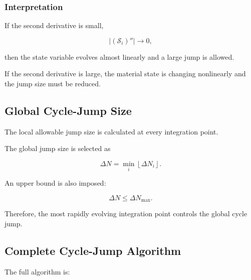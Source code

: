 ﻿\documentclass[11pt,a4paper]{article}
\begin{document}
\subsubsection*{Interpretation}

If the second derivative is small,

\[
\left|
\left(
\bm{\mathcal{S}}_i
\right)''
\right|
\rightarrow 0,
\]

then the state variable evolves almost linearly and a large jump is allowed.

If the second derivative is large, the material state is changing nonlinearly and the jump size must be reduced.

\subsection{Global Cycle-Jump Size}

The local allowable jump size is calculated at every integration point.

The global jump size is selected as

\[
\Delta N
=
\min_i
\left\lfloor
\Delta N_i
\right\rfloor.
\]

An upper bound is also imposed:

\[
\Delta N
\leq
\Delta N_{\max}.
\]

Therefore, the most rapidly evolving integration point controls the global cycle jump.

\subsection{Complete Cycle-Jump Algorithm}

The full algorithm is:
\end{document}

